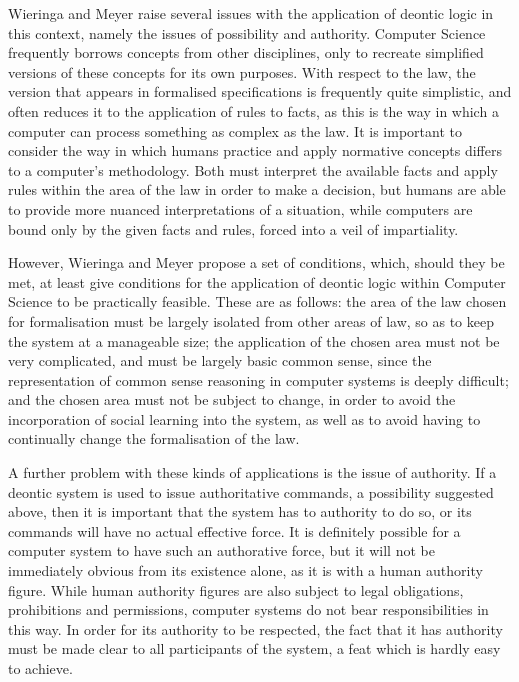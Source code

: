 \documentclass{l4proj}
\begin{document}
Wieringa and Meyer raise several issues with the application of deontic logic in this context, namely the issues of possibility and authority. Computer Science frequently borrows concepts from other disciplines, only to recreate simplified versions of these concepts for its own purposes. With respect to the law, the version that appears in formalised specifications is frequently quite simplistic, and often reduces it to the application of rules to facts, as this is the way in which a computer can process something as complex as the law. It is important to consider the way in which humans practice and apply normative concepts differs to a computer's methodology. Both must interpret the available facts and apply rules within the area of the law in order to make a decision, but humans are able to provide more nuanced interpretations of a situation, while computers are bound only by the given facts and rules, forced into a veil of impartiality. 

However, Wieringa and Meyer propose a set of conditions, which, should they be met, at least give conditions for the application of deontic logic within Computer Science to be practically feasible. These are as follows: the area of the law chosen for formalisation must be largely isolated from other areas of law, so as to keep the system at a manageable size; the application of the chosen area must not be very complicated, and must be largely basic common sense, since the representation of common sense reasoning in computer systems is deeply difficult; and the chosen area must not be subject to change, in order to avoid the incorporation of social learning into the system, as well as to avoid having to continually change the formalisation of the law. 

A further problem with these kinds of applications is the issue of authority. If a deontic system is used to issue authoritative commands, a possibility suggested above, then it is important that the system has to authority to do so, or its commands will have no actual effective force. It is definitely possible for a computer system to have such an authorative force, but it will not be immediately obvious from its existence alone, as it is with a human authority figure. While human authority figures are also subject to legal obligations, prohibitions and permissions, computer systems do not bear responsibilities in this way. In order for its authority to be respected, the fact that it has authority must be made clear to all participants of the system, a feat which is hardly easy to achieve. 
\end{document}

